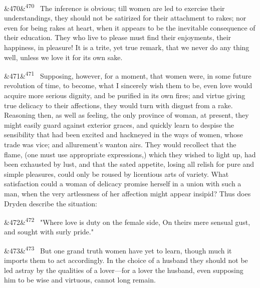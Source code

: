 \documentclass[12pt]{article}
\newcommand{\para}[1][]{\par\noindent\ifx&#1&\else\textsuperscript{\footnotesize #1}~\fi}
\begin{document}
\para[470] The inference is obvious; till women are led to exercise their understandings, they should not be satirized for their attachment to rakes; nor even for being rakes at heart, when it appears to be the inevitable consequence of their education. They who live to please must find their enjoyments, their happiness, in pleasure! It is a trite, yet true remark, that we never do any thing well, unless we love it for its own sake.

\para[471] Supposing, however, for a moment, that women were, in some future revolution of time, to become, what I sincerely wish them to be, even love would acquire more serious dignity, and be purified in its own fires; and virtue giving true delicacy to their affections, they would turn with disgust from a rake. Reasoning then, as well as feeling, the only province of woman, at present, they might easily guard against exterior graces, and quickly learn to despise the sensibility that had been excited and hackneyed in the ways of women, whose trade was vice; and allurement's wanton airs. They would recollect that the flame, (one must use appropriate expressions,) which they wished to light up, had been exhausted by lust, and that the sated appetite, losing all relish for pure and simple pleasures, could only be roused by licentious arts of variety. What satisfaction could a woman of delicacy promise herself in a union with such a man, when the very artlessness of her affection might appear insipid? Thus does Dryden describe the situation:

\para[472] "Where love is duty on the female side, On theirs mere sensual gust, and sought with surly pride."

\para[473] But one grand truth women have yet to learn, though much it imports them to act accordingly. In the choice of a husband they should not be led astray by the qualities of a lover---for a lover the husband, even supposing him to be wise and virtuous, cannot long remain.
\end{document}
